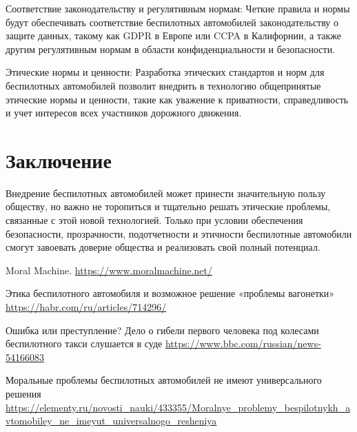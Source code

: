 \documentclass{article}
\begin{document}
\begin{itemize}
\begin{itemize}
        Соответствие законодательству и регулятивным нормам: Четкие правила и нормы будут обеспечивать соответствие беспилотных автомобилей законодательству о защите данных, такому как GDPR в Европе или CCPA в Калифорнии, а также другим регулятивным нормам в области конфиденциальности и безопасности.

        Этические нормы и ценности: Разработка этических стандартов и норм для беспилотных автомобилей позволит внедрить в технологию общепринятые этические нормы и ценности, такие как уважение к приватности, справедливость и учет интересов всех участников дорожного движения.
    \end{itemize}
\end{itemize}


\section{Заключение}

Внедрение беспилотных автомобилей может принести значительную пользу обществу, но важно не торопиться и тщательно решать этические проблемы, связанные с этой новой технологией. Только при условии обеспечения безопасности, прозрачности, подотчетности и этичности беспилотные автомобили смогут завоевать доверие общества и реализовать свой полный потенциал.



\begin{thebibliography}{9}

    Moral Machine. \url{https://www.moralmachine.net/}
    
    Этика беспилотного автомобиля и возможное решение «проблемы вагонетки» \url{https://habr.com/ru/articles/714296/}
    
    Ошибка или преступление? Дело о гибели первого человека под колесами беспилотного такси слушается в суде \url{https://www.bbc.com/russian/news-54166083}
    
    Моральные проблемы беспилотных автомобилей не имеют универсального решения \url{https://elementy.ru/novosti_nauki/433355/Moralnye_problemy_bespilotnykh_avtomobiley_ne_imeyut_universalnogo_resheniya}
    
    \end{thebibliography}
\end{document}
